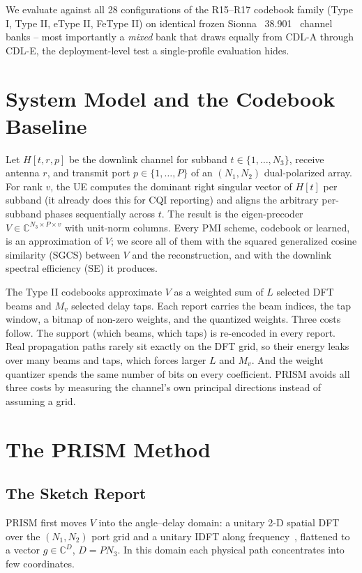 \documentclass[conference]{IEEEtran}
\begin{document}
We evaluate against all 28 configurations of the R15--R17 codebook family (Type I, Type II, eType II, FeType II) on identical frozen Sionna~\cite{sionna} 38.901~\cite{3gpp38901} channel banks -- most importantly a \emph{mixed} bank that draws equally from CDL-A through CDL-E, the deployment-level test a single-profile evaluation hides.

\section{System Model and the Codebook Baseline}
Let $H[t,r,p]$ be the downlink channel for subband $t\in\{1,\dots,N_3\}$, receive antenna $r$, and transmit port $p\in\{1,\dots,P\}$ of an $(N_1,N_2)$ dual-polarized array. For rank $v$, the UE computes the dominant right singular vector of $H[t]$ per subband (it already does this for CQI reporting) and aligns the arbitrary per-subband phases sequentially across $t$. The result is the eigen-precoder $V\in\mathbb{C}^{N_3\times P\times v}$ with unit-norm columns. Every PMI scheme, codebook or learned, is an approximation of $V$; we score all of them with the squared generalized cosine similarity (SGCS) between $V$ and the reconstruction, and with the downlink spectral efficiency (SE) it produces.

The Type II codebooks approximate $V$ as a weighted sum of $L$ selected DFT beams and $M_v$ selected delay taps. Each report carries the beam indices, the tap window, a bitmap of non-zero weights, and the quantized weights. Three costs follow. The support (which beams, which taps) is re-encoded in every report. Real propagation paths rarely sit exactly on the DFT grid, so their energy leaks over many beams and taps, which forces larger $L$ and $M_v$. And the weight quantizer spends the same number of bits on every coefficient. PRISM avoids all three costs by measuring the channel's own principal directions instead of assuming a grid.

\section{The PRISM Method}
\subsection{The Sketch Report}
PRISM first moves $V$ into the angle--delay domain: a unitary 2-D spatial DFT over the $(N_1,N_2)$ port grid and a unitary IDFT along frequency~\cite{wen2018csinet}, flattened to a vector $g\in\mathbb{C}^{D}$, $D=PN_3$. In this domain each physical path concentrates into few coordinates.
\end{document}
